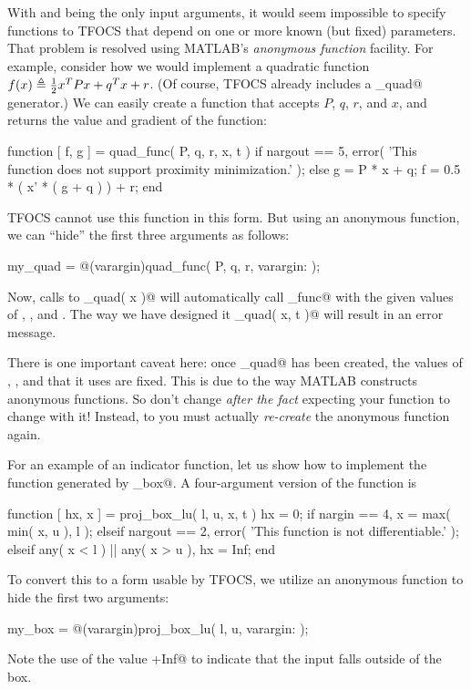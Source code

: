 \documentclass{article}
\begin{document}
With \verb@x@ and \verb@t@ being the only input arguments,
it would seem impossible
to specify functions to TFOCS that depend on one or more known 
(but fixed) parameters. That problem is resolved using MATLAB's
\emph{anonymous function} facility. For example, consider how we 
would implement a quadratic function $f(x)\triangleq {\textstyle\frac{1}{2}} x^TPx+q^Tx+r$.
(Of course, TFOCS already includes a \verb@smooth_quad@ generator.)
We can easily create a
function that accepts $P$, $q$, $r$, and $x$, and returns the
value and gradient of the function:
\begin{code}
	function [ f, g ] = quad_func( P, q, r, x, t )
	if nargout == 5,
	    error( 'This function does not support proximity minimization.' );
	else
	    g = P * x + q;
	    f = 0.5 * ( x' * ( g + q ) ) + r;
	end
\end{code}
TFOCS cannot use this function in this form.
But using an anonymous function, we can ``hide'' the first three 
arguments as follows:
\begin{code}
	my_quad = @(varargin)quad_func( P, q, r, varargin{:} );
\end{code}
Now, calls to \verb@my_quad( x )@ will automatically call \verb@quad_func@
with the given values of \verb@P@, \verb@q@, and \verb@r@. The way we
have designed it \verb@my_quad( x, t )@ will result in an error
message.

There is
one important caveat here: once \verb@my_quad@ has been created, the
values of \verb@P@, \verb@q@, and \verb@r@ that it uses are fixed.
This is due to the way MATLAB constructs anonymous functions. So
don't change \verb@P@ \emph{after the fact} expecting your function
to change with it! Instead, to you must actually
\emph{re-create} the anonymous function again.

For an example of an indicator function, let us show how to implement the
function generated by \verb@proj_box@. A four-argument version of
the function is
\begin{code}	
	function [ hx, x ] = proj_box_lu( l, u, x, t )
	hx = 0;
	if nargin == 4,
	    x = max( min( x, u ), l );
	elseif nargout == 2,
	    error( 'This function is not differentiable.' );
	elseif any( x < l ) || any( x > u ),
	    hx = Inf;
	end
\end{code}
To convert this to a form usable by TFOCS, we utilize an anonymous
function to hide the first two arguments:
\begin{code}
	my_box = @(varargin)proj_box_lu( l, u, varargin{:} );
\end{code}
Note the use of the value \verb@+Inf@ to indicate that the
input \verb@x@ falls outside of the box.
\end{document}
